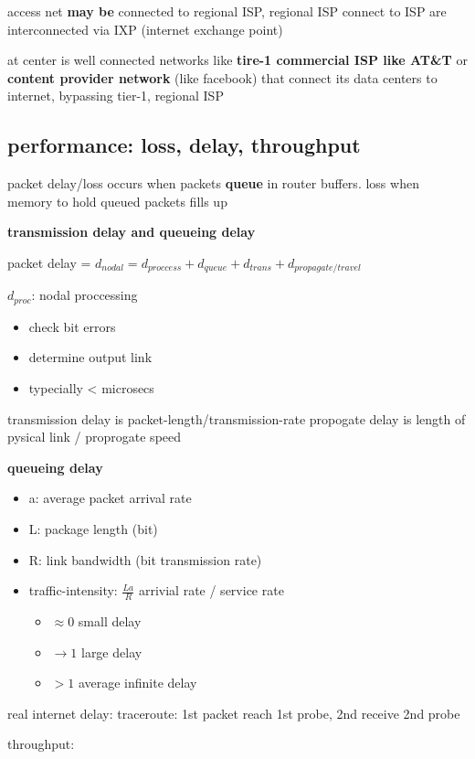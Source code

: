 \documentclass[10pt]{article}
\theoremstyle{break}
\begin{document}
access net \textbf{may be} connected to regional ISP, regional ISP connect to ISP are interconnected via IXP (internet exchange point)

at center is well connected networks like \textbf{tire-1 commercial ISP like AT\&T} or \textbf{content provider network} (like facebook) that connect its data centers to internet, bypassing tier-1, regional ISP

\subsection{performance: loss, delay, throughput}
packet delay/loss occurs when packets \textbf{queue} in router buffers. loss when memory to hold queued packets fills up

\textbf{transmission delay and queueing delay}

packet delay = $d_{nodal}=d_{proccess}+d_{queue}+d_{trans}+d_{propagate/travel}$

$d_{proc}$: nodal proccessing 
\begin{itemize}
    \item check bit errors 
    \item determine output link 
    \item typecially < microsecs
\end{itemize}

transmission delay is packet-length/transmission-rate 
propogate delay is length of pysical link / proprogate speed 

\textbf{queueing delay}
\begin{itemize}
    \item a: average packet arrival rate 
    \item L: package length (bit)
    \item R: link bandwidth (bit transmission rate)
    \item traffic-intensity: $\frac{L a}{R}$ arrivial rate / service rate \begin{itemize}
        \item $\approx 0$ small delay 
        \item $\rightarrow 1$ large delay 
        \item $>1$ average infinite delay
    \end{itemize}
\end{itemize}

real internet delay: traceroute: 1st packet reach 1st probe, 2nd receive 2nd probe

throughput:
\end{document}
